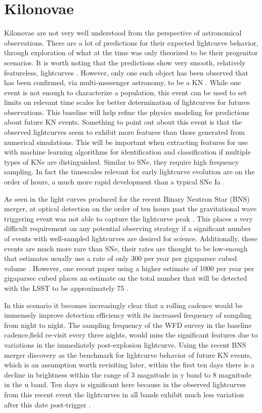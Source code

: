 \documentclass[12pt]{article}
\begin{document}
\section{Kilonovae} %
Kilonovae are not very well understood from the perspective of astronomical observations. There are a lot of predictions for their expected lightcurve behavior, through exploration of what at the time was only theorized to be their progenitor scenarios. It is worth noting that the predictions show very smooth, relatively featureless, lightcurves \citep{Rosswog2016a}. However, only one such object has been observed that has been confirmed, via multi-messenger astronomy, to be a KN \citep{Kasliwal2017}. While one event is not enough to characterize a population, this event can be used to set limits on relevant time scales for better determination of lightcurves for futures observations. This baseline will help refine the physics modeling for predictions about future KN events. Something to point out about this event is that the observed lightcurves seem to exhibit more features than those generated from numerical simulations. This will be important when extracting features for use with machine learning algorithms for identification and classification if multiple types of KNe are distinguished. Similar to SNe, they require high frequency sampling. In fact the timescales relevant for early lightcurve evolution are on the order of hours, a much more rapid development than a typical SNe Ia \citep{Villar2017}. \par
As seen in the light curves produced for the recent Binary Neutron Star (BNS) merger, at optical detection on the order of ten hours past the gravitational wave triggering event was not able to capture the lightcurve peak \citep{Villar2017}. This places a very difficult requirement on any potential observing strategy if a significant number of events with well-sampled lightcurves are desired for science. Additionally, these events are much more rare than SNe, their rates are thought to be low-enough that estimates usually use a rate of only 300 per year per gigaparsec cubed volume \citep{Rosswog2016a}. However, one recent paper using a higher estimate of 1000 per year per gigaparsec cubed places an estimate on the total number that will be detected with the LSST to be approximately 75 \citep{Scolnic2017}.\par
In this scenario it becomes increasingly clear that a rolling cadence would be immensely improve detection efficiency with its increased frequency of sampling from night to night. The sampling frequency of the WFD survey in the baseline cadence,field re-visit every three nights, would miss the significant features due to variations in the immediately post-explosion lightcurve. Using the recent BNS merger discovery as the benchmark for lightcurve behavior of future KN events, which is an assumption worth revisiting later, within the first ten days there is a decline in brightness within the range of 3 magnitude in y band to 8 magnitude in the u band. Ten days is significant here because in the observed lightcurves from this recent event the lightcurves in all bands exhibit much less variation after this date post-trigger \citep{Villar2017}. \par
\end{document}
